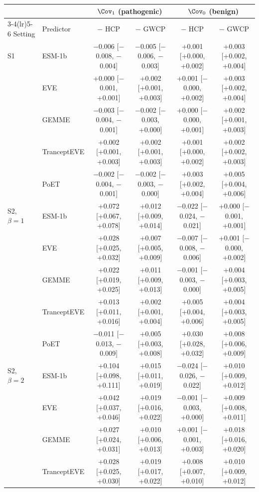 \begin{tabular}{llcccc}
\toprule
 & & \multicolumn{2}{c}{$\Cov_1$ (pathogenic)} & \multicolumn{2}{c}{$\Cov_0$ (benign)} \\
\cmidrule(lr){3-4}\cmidrule(lr){5-6}
Setting & Predictor & $-$ HCP & $-$ GWCP & $-$ HCP & $-$ GWCP \\
\midrule
S1 & ESM-1b & $-$0.006 [$-$0.008, $-$0.004] & $-$0.005 [$-$0.006, $-$0.003] & +0.001 [+0.000, +0.002] & +0.003 [+0.002, +0.004] \\
 & EVE & +0.000 [$-$0.001, +0.001] & +0.002 [+0.001, +0.003] & +0.001 [$-$0.000, +0.002] & +0.003 [+0.002, +0.004] \\
 & GEMME & $-$0.003 [$-$0.004, $-$0.001] & $-$0.002 [$-$0.003, +0.000] & +0.000 [$-$0.000, +0.001] & +0.002 [+0.001, +0.003] \\
 & TranceptEVE & +0.002 [+0.001, +0.003] & +0.002 [+0.001, +0.003] & +0.001 [+0.000, +0.002] & +0.002 [+0.002, +0.003] \\
 & PoET & $-$0.002 [$-$0.004, $-$0.001] & $-$0.002 [$-$0.003, $-$0.000] & +0.003 [+0.002, +0.004] & +0.005 [+0.004, +0.006] \\
\midrule
S2, $\beta=1$ & ESM-1b & +0.072 [+0.067, +0.078] & +0.012 [+0.009, +0.014] & $-$0.022 [$-$0.024, $-$0.021] & +0.000 [$-$0.001, +0.001] \\
 & EVE & +0.028 [+0.025, +0.032] & +0.007 [+0.005, +0.009] & $-$0.007 [$-$0.008, $-$0.006] & +0.001 [$-$0.000, +0.002] \\
 & GEMME & +0.022 [+0.019, +0.025] & +0.011 [+0.009, +0.013] & $-$0.001 [$-$0.003, $-$0.000] & +0.004 [+0.003, +0.005] \\
 & TranceptEVE & +0.013 [+0.011, +0.016] & +0.002 [+0.001, +0.004] & +0.005 [+0.004, +0.006] & +0.004 [+0.003, +0.005] \\
 & PoET & $-$0.011 [$-$0.013, $-$0.009] & +0.005 [+0.003, +0.008] & +0.030 [+0.028, +0.032] & +0.008 [+0.006, +0.009] \\
\midrule
S2, $\beta=2$ & ESM-1b & +0.104 [+0.098, +0.111] & +0.015 [+0.011, +0.019] & $-$0.024 [$-$0.026, $-$0.022] & +0.010 [+0.009, +0.012] \\
 & EVE & +0.042 [+0.037, +0.046] & +0.019 [+0.016, +0.022] & $-$0.001 [$-$0.003, +0.000] & +0.009 [+0.008, +0.011] \\
 & GEMME & +0.027 [+0.024, +0.031] & +0.010 [+0.006, +0.013] & +0.001 [$-$0.001, +0.003] & +0.018 [+0.016, +0.020] \\
 & TranceptEVE & +0.028 [+0.025, +0.030] & +0.019 [+0.017, +0.022] & +0.008 [+0.007, +0.010] & +0.010 [+0.009, +0.012] \\

\end{tabular}
